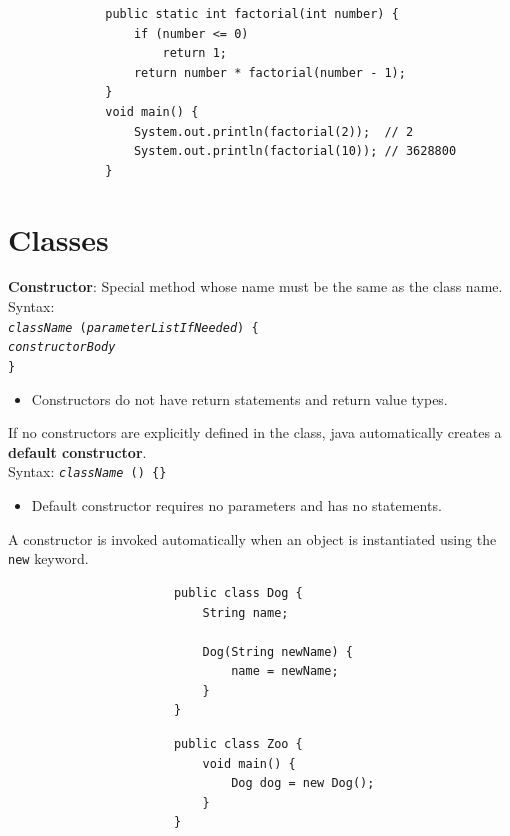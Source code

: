 \documentclass{article}
\begin{document}
\begin{figure}[h!]
	\centering
	\begin{verbatim}
		public static int factorial(int number) {
		    if (number <= 0)
		        return 1;
		    return number * factorial(number - 1);
		}
		void main() {
		    System.out.println(factorial(2));  // 2
		    System.out.println(factorial(10)); // 3628800
		}
	\end{verbatim}
\end{figure}
\newpage

\null
\newpage

\section{Classes}
\textbf{Constructor}: Special method whose name must be the same as the class name.\\
Syntax:\\
\texttt{\textit{className} (\textit{parameterListIfNeeded}) \{\\
\hspace*{2em}\textit{constructorBody}\\
\}}
\begin{itemize}
	\item Constructors do not have return statements and return value types.
\end{itemize}
If no constructors are explicitly defined in the class, java automatically creates a \textbf{default constructor}.\\
Syntax: \texttt{\textit{className} () \{\}}
\begin{itemize}
	\item Default constructor requires no parameters and has no statements.
\end{itemize}
A constructor is invoked automatically when an object is instantiated using the \texttt{new} keyword.

\begin{figure}[h]
	\centering
	\begin{subfigure}[h!]{.45\textwidth}
		\begin{verbatim}
			public class Dog {
			    String name;
			    
			    Dog(String newName) {
			        name = newName;
			    }
			}
		\end{verbatim}
	\end{subfigure}
	\begin{subfigure}[h!]{.45\textwidth}
		\begin{verbatim}
			public class Zoo {
			    void main() {
			        Dog dog = new Dog();
			    }
			}
		\end{verbatim}
	\end{subfigure}
\end{figure}
\end{document}
